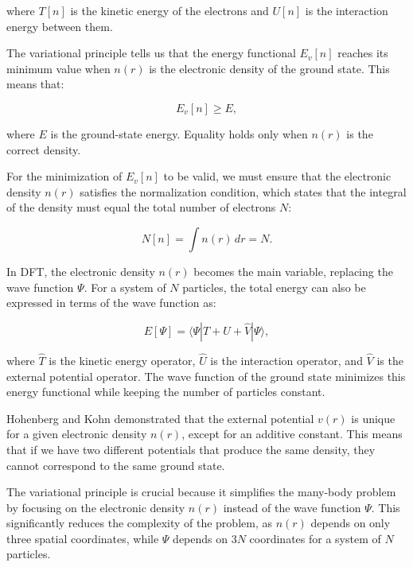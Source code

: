 \documentclass[%
 preprint, linenumbers,
 amsmath,amssymb,
 aps, physrev,
]{revtex4-2}
\begin{document}
where \( T[n] \) is the kinetic energy of the electrons and \( U[n] \) is the interaction energy between them.

The variational principle tells us that the energy functional \( E_v[n] \) reaches its minimum value when \( n(r) \) is the electronic density of the ground state. This means that:

\begin{equation}
E_v[n] \geq E,
\end{equation}

where \( E \) is the ground-state energy. Equality holds only when \( n(r) \) is the correct density.

For the minimization of \( E_v[n] \) to be valid, we must ensure that the electronic density \( n(r) \) satisfies the normalization condition, which states that the integral of the density must equal the total number of electrons \( N \):

\begin{equation}
N[n] = \int n(r) \, dr = N.
\end{equation}

In DFT, the electronic density \( n(r) \) becomes the main variable, replacing the wave function \( \Psi \). For a system of \( N \) particles, the total energy can also be expressed in terms of the wave function as:

\begin{equation}
E[\Psi] = \langle \Psi | \hat{T} + \hat{U} + \hat{V} | \Psi \rangle,
\end{equation}

where \( \hat{T} \) is the kinetic energy operator, \( \hat{U} \) is the interaction operator, and \( \hat{V} \) is the external potential operator. The wave function of the ground state minimizes this energy functional while keeping the number of particles constant.

Hohenberg and Kohn demonstrated that the external potential \( v(r) \) is unique for a given electronic density \( n(r) \), except for an additive constant. This means that if we have two different potentials that produce the same density, they cannot correspond to the same ground state.

The variational principle is crucial because it simplifies the many-body problem by focusing on the electronic density \( n(r) \) instead of the wave function \( \Psi \). This significantly reduces the complexity of the problem, as \( n(r) \) depends on only three spatial coordinates, while \( \Psi \) depends on \( 3N \) coordinates for a system of \( N \) particles.
\end{document}
